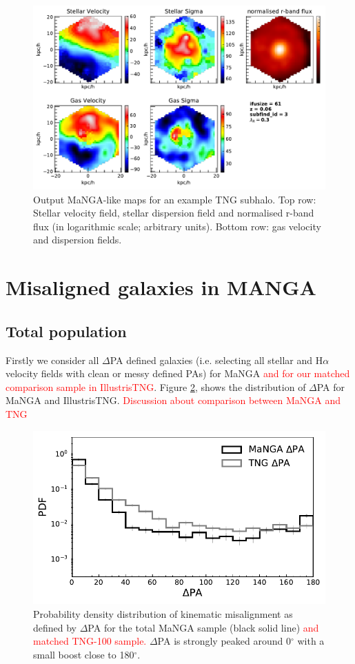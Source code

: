 \documentclass[fleqn,usenatbib]{mnras}
\newcommand{\red}[1]{{\textcolor{red}{#1}}}
\begin{document}
\begin{figure}
	\includegraphics[width=\linewidth]{example_grid.pdf}
    \caption{Output MaNGA-like maps for an example TNG subhalo. Top row: Stellar velocity field, stellar dispersion field and normalised r-band flux (in logarithmic scale; arbitrary units). Bottom row: gas velocity and dispersion fields.}
    \label{fig:example_obs}
\end{figure}

\section{Misaligned galaxies in MANGA} \label{sec:manga_results}
\subsection{Total population} \label{sec:manga_total_pop}
Firstly we consider all $\Delta$PA defined galaxies (i.e. selecting all stellar and H$\alpha$ velocity fields with clean or messy defined PAs) for MaNGA \red{and for our matched comparison sample in IllustrisTNG}. Figure \ref{fig:total_pa_dist}, shows the distribution of $\Delta$PA for MaNGA and IllustrisTNG. \red{Discussion about comparison between MaNGA and TNG}

\begin{figure}
	\includegraphics[width=\linewidth]{total_pop/mpl8_pa_dist.pdf}
    \caption{Probability density distribution of kinematic misalignment as defined by $\Delta$PA for the total MaNGA sample (black solid line) \red{and matched TNG-100 sample.} $\Delta$PA is strongly peaked around 0$^{\circ}$ with a small boost close to 180$^{\circ}$.}
    \label{fig:total_pa_dist}
\end{figure}
\end{document}
